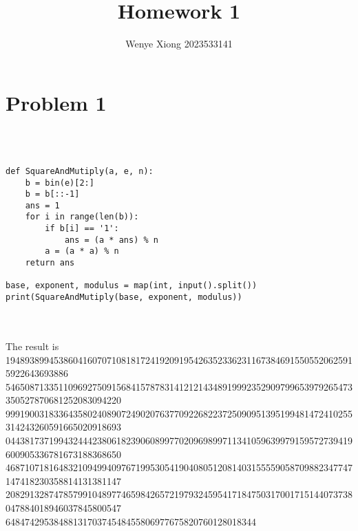 \documentclass{article}
\author{Wenye Xiong 2023533141}
\title{Homework 1}
\begin{document}
\maketitle

\section{Problem 1}
\\ \hspace*{\fill} \\

\linebreak
\begin{lstlisting}
def SquareAndMutiply(a, e, n):
    b = bin(e)[2:]
    b = b[::-1]
    ans = 1
    for i in range(len(b)):
        if b[i] == '1':
            ans = (a * ans) % n
        a = (a * a) % n
    return ans

base, exponent, modulus = map(int, input().split())
print(SquareAndMutiply(base, exponent, modulus))
\end{lstlisting}
\\ \hspace*{\fill} \\
The result is 1948938994538604160707108181724192091954263523362311673846915505520625915922643693886\\546508713351109692750915684157878314121214348919992352909799653979265473350527870681252083094220\\999190031833643580240890724902076377092268223725090951395199481472410255314243260591665020918693\\044381737199432444238061823906089977020969899711341059639979159572739419600905336781673188368650\\468710718164832109499409767199530541904080512081403155559058709882347747147418230358814131381147\\208291328747857991048977465984265721979324595417184750317001715144073738047884018946037845800547\\6484742953848813170374548455806977675820760128018344\\
\\ \hspace*{\fill} \\
\newpage
\end{document}
